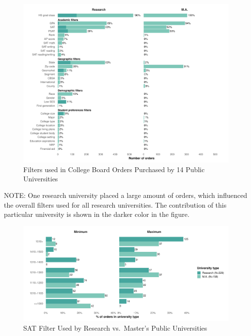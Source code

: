 \documentclass[
  12pt,
]{article}
\begin{document}
\begin{figure}
\centering
\includegraphics{eepa_student_list_manuscript_c_a_files/figure-latex/order-filters-empirical-report-1.pdf}
\caption{\label{fig:order-filters-empirical-report}Filters used in College Board Orders Purchased by 14 Public Universities}
\end{figure}

\begingroup
\fontsize{8}{8}\selectfont

NOTE: One research university placed a large amount of orders, which influenced the overall filters used for all research universities. The contribution of this particular university is shown in the darker color in the figure.
\endgroup

\begin{figure}
\centering
\includegraphics{eepa_student_list_manuscript_c_a_files/figure-latex/orders-sat-1.pdf}
\caption{\label{fig:orders-sat}SAT Filter Used by Research vs.~Master's Public Universities}
\end{figure}
\end{document}
